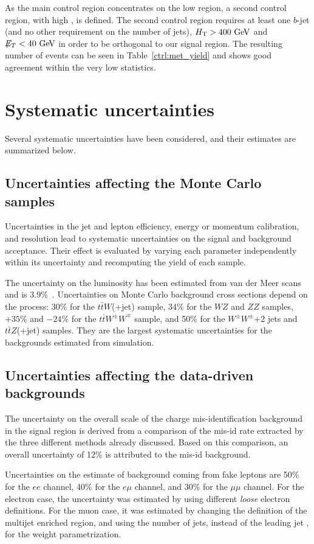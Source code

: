 As the main control region concentrates on the low
\HT{} region, a second control region, with high \HT{}, is defined.
The second control region requires at least one $b$-jet 
(and no other requirement on the number of jets), 
$\HT>400 \GeV$ and $\met<40 \GeV$ in order to be
orthogonal to our signal region. The resulting number of events can be seen in Table~\ref{ctrl:met_yield}
and shows good agreement within the very low statistics.

\section{Systematic uncertainties}\label{sect:syst}
Several systematic uncertainties have been considered, and their estimates are summarized below.

\subsection{Uncertainties affecting the Monte Carlo samples}
Uncertainties in the jet and lepton efficiency,
energy or momentum calibration, and resolution lead to systematic uncertainties on the signal
and background acceptance. Their effect is evaluated by varying each parameter independently
within its uncertainty and recomputing the yield of each sample.

The uncertainty on the luminosity has been estimated from van der Meer 
scans and is 3.9\%~\cite{Aad:2011dr,ATLAS-CONF-2011-116}. 
Uncertainties on Monte Carlo background cross sections depend on the process:
30\% for the $t\bar{t}W$(+jet) sample, 34\% for the $WZ$ and $ZZ$ samples,
$+35$\% and $-24$\% for the $t\bar{t}W^{\pm}W^{\mp}$ sample, and
50\% for the $W^{\pm}W^{\pm}$+2 jets
and $t\bar{t}Z$(+jet) samples. They are the largest systematic uncertainties for the
backgrounds estimated from simulation.

\subsection{Uncertainties affecting the data-driven backgrounds}

The uncertainty on the overall scale of the charge mis-identification background in the signal region 
is derived  from a comparison of the mis-id rate extracted by the three different methods already
discussed. Based on this comparison, an overall uncertainty of 12\% is attributed to the mis-id background.

Uncertainties on the estimate of background coming from fake leptons are 50\% for the $ee$ 
channel, 40\% for the $e\mu$ channel, and 30\% for the $\mu\mu$ channel.
For the electron case, the uncertainty was estimated by using different {\it loose} electron 
definitions. For the muon case, it was estimated by changing the definition of the multijet 
enriched region, and using the number of jets, instead of the leading jet \pT{}, for the
weight parametrization.

